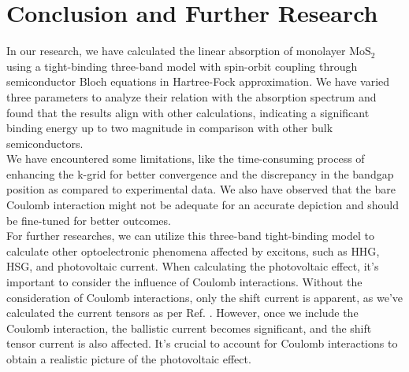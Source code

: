 \documentclass[12pt,english,a4paper]{article}
\begin{document}
\section{Conclusion and Further Research}
\quad In our research, we have calculated the linear absorption of monolayer $\mathrm{MoS}_2$ using a tight-binding three-band model with spin-orbit coupling through semiconductor Bloch equations in Hartree-Fock approximation. We have varied three parameters to analyze their relation with the absorption spectrum and found that the results align with other calculations, indicating a significant binding energy up to two magnitude in comparison with other bulk semiconductors.\\\null
\quad We have encountered some limitations, like the time-consuming process of enhancing the k-grid for better convergence and the discrepancy in the bandgap position as compared to experimental data. We also have observed that the bare Coulomb interaction might not be adequate for an accurate depiction and should be fine-tuned for better outcomes.\\\null
\quad For further researches, we can utilize this three-band tight-binding model to calculate other optoelectronic phenomena affected by excitons, such as \ac{HHG}, \ac{HSG}, and photovoltaic current. When calculating the photovoltaic effect, it's important to consider the influence of Coulomb interactions. Without the consideration of Coulomb interactions, only the shift current is apparent, as we've calculated the current tensors as per Ref. \cite{vo_calculation_2024}. However, once we include the Coulomb interaction, the ballistic current becomes significant, and the shift tensor current is also affected. It's crucial to account for Coulomb interactions to obtain a realistic picture of the photovoltaic effect.
\end{document}
